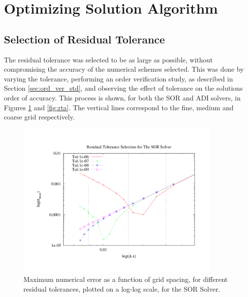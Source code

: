 
\section{Optimizing Solution Algorithm}
\label{sec:opt_sol_alg}


	\subsection{Selection of Residual Tolerance}
	\label{sec:res_tol}

The residual tolerance was selected to be as large as possible, without compromising the accuracy of the numerical schemes selected.  This was done by varying the tolerance, performing an order verification study, as described in Section \ref{sec:ord_ver_std}, and observing the effect of tolerance on the solutions order of accuracy.  This process is shown, for both the SOR and ADI solvers, in Figures \ref{fig:rts} and \ref{fig:rta}.  The vertical lines correspond to the fine, medium and coarse grid respectively.

\begin{figure}[h!]
\center
\includegraphics[width=0.9\textwidth]{plots/rts}
\caption{Maximum numerical error as a function of grid spacing, for different residual tolerances, plotted on a log-log scale, for the SOR Solver.}
\label{fig:rts}
\end{figure}

